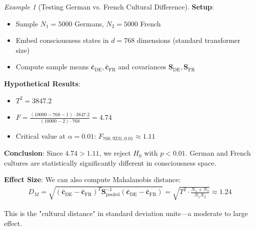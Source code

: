 \documentclass[11pt,a4paper]{article}
\theoremstyle{definition}
\theoremstyle{remark}
\newtheorem{example}{Example}[section]
\newcommand{\cc}{\mathbf{c}}
\begin{document}
\begin{example}[Testing German vs. French Cultural Difference]
\textbf{Setup}:
\begin{itemize}
    \item Sample \(N_1 = 5000\) Germans, \(N_2 = 5000\) French
    \item Embed consciousness states in \(d = 768\) dimensions (standard transformer size)
    \item Compute sample means \(\bar{\cc}_{\text{DE}}, \bar{\cc}_{\text{FR}}\) and covariances \(\mathbf{S}_{\text{DE}}, \mathbf{S}_{\text{FR}}\)
\end{itemize}

\textbf{Hypothetical Results}:
\begin{itemize}
    \item \(T^2 = 3847.2\)
    \item \(F = \frac{(10000-768-1) \cdot 3847.2}{(10000-2) \cdot 768} = 4.74\)
    \item Critical value at \(\alpha=0.01\): \(F_{768, 9231, 0.01} \approx 1.11\)
\end{itemize}

\textbf{Conclusion}: Since \(4.74 > 1.11\), we reject \(H_0\) with \(p < 0.01\). German and French cultures are statistically significantly different in consciousness space.

\textbf{Effect Size}: We can also compute Mahalanobis distance:
\begin{align}
D_M = \sqrt{(\bar{\cc}_{\text{DE}} - \bar{\cc}_{\text{FR}})^T \mathbf{S}_{\text{pooled}}^{-1} (\bar{\cc}_{\text{DE}} - \bar{\cc}_{\text{FR}})} = \sqrt{T^2 \cdot \frac{N_1+N_2}{N_1 N_2}} \approx 1.24
\end{align}

This is the "cultural distance" in standard deviation units—a moderate to large effect.
\end{example}
\end{document}
